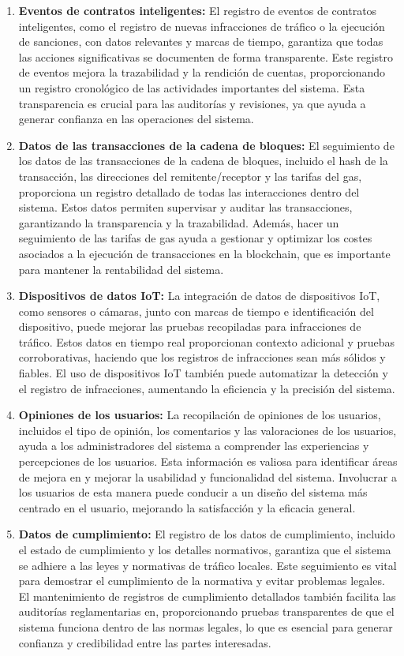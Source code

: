 \begin{enumerate}
        \item \textbf{Eventos de contratos inteligentes:} El registro de eventos de contratos inteligentes, como el registro de nuevas infracciones de tráfico o la ejecución de sanciones, con datos relevantes y marcas de tiempo, garantiza que todas las acciones significativas se documenten de forma transparente. Este registro de eventos mejora la trazabilidad y la rendición de cuentas, proporcionando un registro cronológico de las actividades importantes del sistema. Esta transparencia es crucial para las auditorías y revisiones, ya que ayuda a generar confianza en las operaciones del sistema. 
        \item \textbf{Datos de las transacciones de la cadena de bloques: } El seguimiento de los datos de las transacciones de la cadena de bloques, incluido el hash de la transacción, las direcciones del remitente/receptor y las tarifas del gas, proporciona un registro detallado de todas las interacciones dentro del sistema. Estos datos permiten supervisar y auditar las transacciones, garantizando la transparencia y la trazabilidad. Además, hacer un seguimiento de las tarifas de gas ayuda a gestionar y optimizar los costes asociados a la ejecución de transacciones en la blockchain, que es importante para mantener la rentabilidad del sistema. 
        \item \textbf{Dispositivos de datos IoT:} La integración de datos de dispositivos IoT, como sensores o cámaras, junto con marcas de tiempo e identificación del dispositivo, puede mejorar las pruebas recopiladas para infracciones de tráfico. Estos datos en tiempo real proporcionan contexto adicional y pruebas corroborativas, haciendo que los registros de infracciones sean más sólidos y fiables. El uso de dispositivos IoT también puede automatizar la detección y el registro de infracciones, aumentando la eficiencia y la precisión del sistema.
            \item \textbf{Opiniones de los usuarios: } La recopilación de opiniones de los usuarios, incluidos el tipo de opinión, los comentarios y las valoraciones de los usuarios, ayuda a los administradores del sistema a comprender las experiencias y percepciones de los usuarios. Esta información es valiosa para identificar áreas de mejora en y mejorar la usabilidad y funcionalidad del sistema. Involucrar a los usuarios de esta manera puede conducir a un diseño del sistema más centrado en el usuario, mejorando la satisfacción y la eficacia general. 
                \item \textbf{Datos de cumplimiento: } El registro de los datos de cumplimiento, incluido el estado de cumplimiento y los detalles normativos, garantiza que el sistema se adhiere a las leyes y normativas de tráfico locales. Este seguimiento es vital para demostrar el cumplimiento de la normativa y evitar problemas legales. El mantenimiento de registros de cumplimiento detallados también facilita las auditorías reglamentarias en, proporcionando pruebas transparentes de que el sistema funciona dentro de las normas legales, lo que es esencial para generar confianza y credibilidad entre las partes interesadas.
\end{enumerate}
